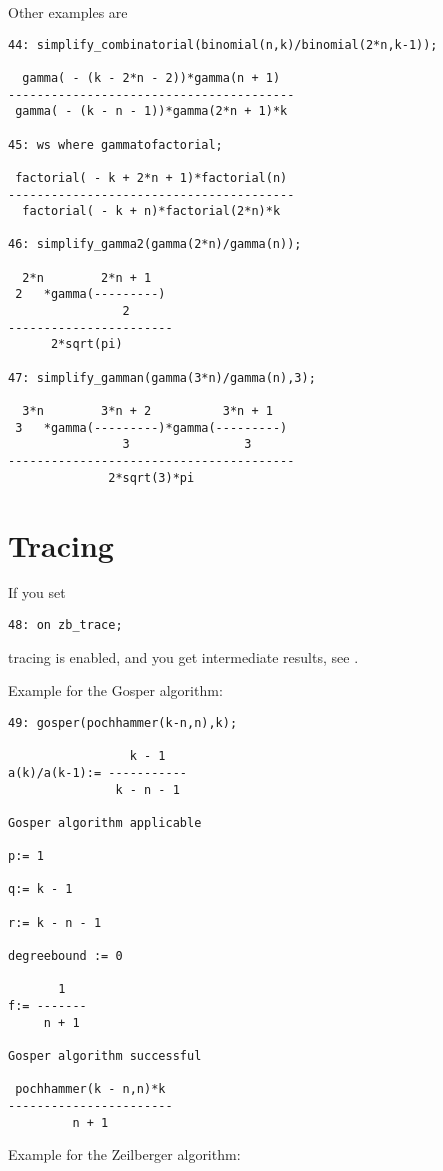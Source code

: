Other examples are

{\small
\begin{verbatim}
44: simplify_combinatorial(binomial(n,k)/binomial(2*n,k-1));

  gamma( - (k - 2*n - 2))*gamma(n + 1)
----------------------------------------
 gamma( - (k - n - 1))*gamma(2*n + 1)*k

45: ws where gammatofactorial;

 factorial( - k + 2*n + 1)*factorial(n)
----------------------------------------
  factorial( - k + n)*factorial(2*n)*k

46: simplify_gamma2(gamma(2*n)/gamma(n));

  2*n        2*n + 1
 2   *gamma(---------)
                2
-----------------------
      2*sqrt(pi)

47: simplify_gamman(gamma(3*n)/gamma(n),3);

  3*n        3*n + 2          3*n + 1
 3   *gamma(---------)*gamma(---------)
                3                3
----------------------------------------
              2*sqrt(3)*pi
\end{verbatim}
}\noindent

\section{Tracing}
If you set

{\small
\begin{verbatim}
48: on zb_trace;
\end{verbatim}
}\noindent
tracing is enabled, and you get intermediate results, see \cite{Koepf}.

Example for the Gosper algorithm:

{\small
\begin{verbatim}
49: gosper(pochhammer(k-n,n),k);

                 k - 1
a(k)/a(k-1):= -----------
               k - n - 1

Gosper algorithm applicable

p:= 1

q:= k - 1

r:= k - n - 1

degreebound := 0

       1
f:= -------
     n + 1

Gosper algorithm successful

 pochhammer(k - n,n)*k
-----------------------
         n + 1
\end{verbatim}
}\noindent
\vspace*{3mm}\noindent
Example for the Zeilberger algorithm:

